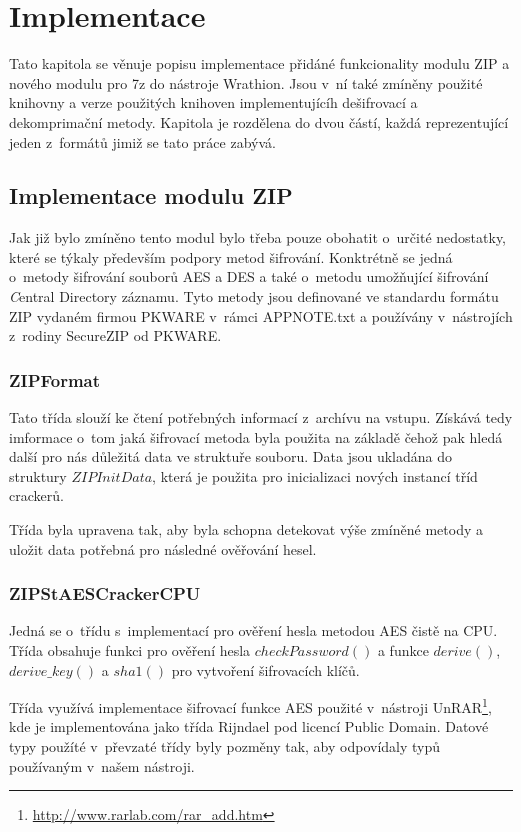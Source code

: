 \chapter{Implementace}
\label{ch:implementace}
Tato kapitola se věnuje popisu implementace přidáné funkcionality modulu ZIP a nového modulu pro
7z do nástroje Wrathion. Jsou v~ní také zmíněny použité knihovny a verze použitých knihoven
implementujícíh dešifrovací a dekomprimační metody. Kapitola je rozdělena do dvou částí, každá
reprezentující jeden z~formátů jimiž se tato práce zabývá.

\section{Implementace modulu ZIP}
Jak již bylo zmíněno tento modul bylo třeba pouze obohatit o~určité nedostatky, které se týkaly
především podpory metod šifrování. Konktrétně se jedná o~metody šifrování souborů AES a DES a také
o~metodu umožňující šifrování {\textit Central Directory} záznamu. Tyto metody jsou definované ve
standardu formátu ZIP vydaném firmou PKWARE v~rámci APPNOTE.txt a používány
v~nástrojích z~rodiny SecureZIP od PKWARE.

\subsection{ZIPFormat}
Tato třída slouží ke čtení potřebných informací z~archívu na vstupu. Získává tedy imformace o~tom
jaká šifrovací metoda byla použita na základě čehož pak hledá další pro nás důležitá data ve
struktuře souboru. Data jsou ukladána do struktury $ZIPInitData$, která je použita pro
inicializaci nových instancí tříd crackerů. 

 Třída byla upravena tak, aby byla schopna detekovat výše zmíněné metody a uložit data potřebná pro
následné ověřování hesel.

\subsection{ZIPStAESCrackerCPU}
Jedná se o~třídu s~implementací pro ověření hesla metodou AES čistě na CPU. Třída obsahuje funkci
pro ověření hesla $checkPassword()$ a funkce $derive()$, $derive\_key()$ a $sha1()$ pro vytvoření
šifrovacích klíčů.

Třída využívá implementace šifrovací funkce AES použité v~nástroji
UnRAR\footnote{\url{http://www.rarlab.com/rar\_add.htm}}, kde je implementována jako třída Rijndael
pod licencí Public Domain. Datové typy použíté v~převzaté třídy byly pozměny tak, aby odpovídaly
typů používaným v~našem nástroji.

